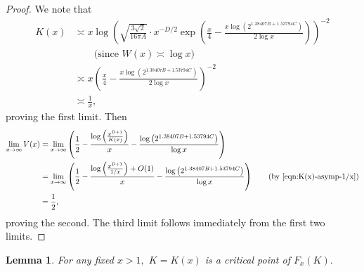 \documentclass[11pt,letterpaper,reqno]{amsart}
\newtheorem{lemma}[theorem]{Lemma}
\theoremstyle{definition}
\numberwithin{equation}{section}
\numberwithin{figure}{section}
\numberwithin{table}{section}
\begin{document}
\begin{proof}
    We note that
    \begin{align}
        K(x) &\asymp  x \log\! \left( \sqrt{\frac{3\sqrt{2}}{16 \pi A}} \cdot x^{-D/2} \exp\left( \frac{x}{4} - \frac{x \log\left( 2^{1.38407B +  1.53794C}  \right)}{2\log x}  \right)  \right)^{-2} \\
        & \qquad \text{(since $W(x) \asymp \log x$)}\\
        &\asymp  x \left( \frac{x}{4} - \frac{x \log\left( 2^{1.38407B +  1.53794C}  \right)}{2\log x}  \right)^{-2} \\
        &\asymp \frac{1}{x}, \label{eqn:K(x)-asymp-1/x}
    \end{align}
    proving the first limit. Then
    \begin{align}
        \lim_{x \rightarrow \infty} V(x) &= \lim_{x \rightarrow \infty} \left( \frac{1}{2} - \frac{\log\left( \frac{x^{D + 1}}{K(x)}  \right)}{x} - \frac{\log \left( 2^{1.38407B +  1.53794C}  \right)}{\log x} \right)\\
        &= \lim_{x \rightarrow \infty} \left( \frac{1}{2} - \frac{\log\left( \frac{x^{D + 1}}{1/x}  \right) + O(1)}{x} - \frac{\log \left( 2^{1.38407B +  1.53794C}  \right)}{\log x} \right) \qquad \text{(by \eqref{eqn:K(x)-asymp-1/x})}\\
        &= \frac{1}{2},
    \end{align}
    proving the second. The third limit follows immediately from the first two limits.
\end{proof}

\begin{lemma}\label{lem:K-critical-point}
    For any fixed $x > 1,$ $K = K(x)$ is a critical point of $F_x(K).$
\end{lemma}
\end{document}
